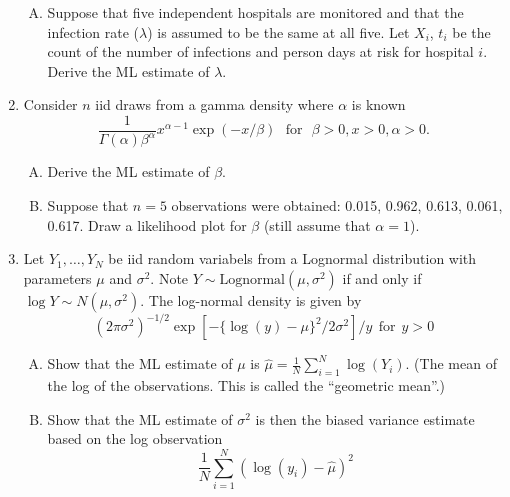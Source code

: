 \documentclass[12pt]{article}
\begin{document}
\begin{enumerate}[Problem 1.]
\begin{enumerate}[A.]
\item Suppose that five independent hospitals are monitored and that the infection rate ($\lambda$) is assumed to be the same at all five. Let $X_i$, $t_i$ be the count of the number of infections
and person days at risk for hospital $i$. Derive the ML estimate of $\lambda$.
\end{enumerate}
\item Consider $n$ iid draws from a gamma density where $\alpha$ is known
$$
\frac{1}{\Gamma(\alpha)\beta^\alpha} x^{\alpha -1} \exp(-x/\beta) ~~~\mbox{for}~~~\beta > 0, x>0, \alpha > 0.
$$
\begin{enumerate}[A.]
\item Derive the ML estimate of $\beta$.
\item Suppose that $n=5$ observations were obtained: 0.015, 0.962, 0.613, 0.061, 0.617. Draw
    a likelihood plot for $\beta$ (still assume that $\alpha = 1$).
\end{enumerate}
\item Let $Y_1,\ldots, Y_N$ be iid random variabels from a Lognormal distribution with parameters
    $\mu$ and $\sigma^2$. Note $Y \sim \mbox{Lognormal}(\mu,\sigma^2)$ if and only if
    $\log Y \sim N(\mu,\sigma^2)$. The log-normal density is given by
    $$
    (2\pi \sigma^2)^{-1/2} \exp[-\{\log(y) - \mu\}^2 / 2\sigma^2] / y ~~\mbox{for}~~ y > 0
    $$
    \begin{enumerate}[A.]
    \item Show that the ML estimate of $\mu$ is $\hat \mu = \frac{1}{N} \sum_{i=1}^N \log(Y_i)$. (The
    mean of the log of the observations. This is called the ``geometric mean''.)
    \item Show that the ML estimate of $\sigma^2$ is then the biased variance estimate based
    on the log observation
    $$
    \frac{1}{N}\sum_{i=1}^N (\log(y_i) - \hat \mu)^2
    $$
    \end{enumerate}
  \end{enumerate}
\end{document}
